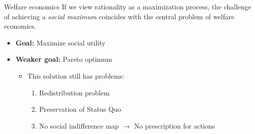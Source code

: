 \documentclass{beamer}
\begin{document}
\begin{frame}{Welfare economics}
    {\setlength{\leftskip}{0.9 cm}}
    If we view rationality as a maximization process, the challenge of achieving a \textit{social maximum} coincides with the central problem of welfare economics.
    \vspace{0.25 cm}
    \begin{itemize}
        \item \textbf{Goal:} Maximize social utility
        \vspace{0.25 cm}
        \item \textbf{Weaker goal:} Pareto optimum
        \vspace{0.25 cm}
        \begin{itemize}
            \item This solution still has problems:
            \begin{enumerate}
                \item Redistribution problem
                \item Preservation of Status Quo
                \item No social indifference map $\rightarrow$ No prescription for actions
            \end{enumerate}
        \end{itemize}
    \end{itemize}

\end{frame}
\end{document}
